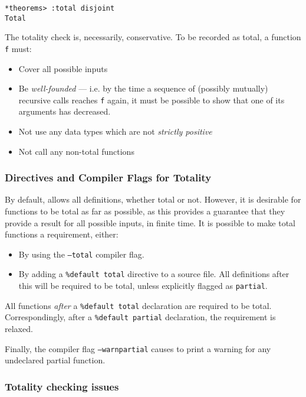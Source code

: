 \begin{lstlisting}[style=stdout]
*theorems> :total disjoint
Total
\end{lstlisting} 

\noindent
The totality check is, necessarily, conservative.
To be recorded as total, a function \texttt{f} must:

\begin{itemize}
\item Cover all possible inputs
\item Be \emph{well-founded} --- i.e. by the time a sequence of  (possibly mutually) recursive calls reaches \texttt{f} again, it must be possible to show that one of its arguments has decreased.
\item Not use any data types which are not \emph{strictly positive}
\item Not call any non-total functions
\end{itemize}

\subsubsection{Directives and Compiler Flags for Totality}

By default, \Idris{} allows all definitions, whether total or not.
However, it is desirable for functions to be total as far as possible, as this provides a guarantee that they provide a result for all possible inputs, in finite time. It is possible to make total functions a requirement, either:

\begin{itemize}
\item By using the \texttt{--total} compiler flag.
\item By adding a \texttt{\%default total} directive to a source file.
All definitions after this will be required to be total, unless explicitly flagged as \texttt{partial}.
\end{itemize}

\noindent
All functions \emph{after} a \texttt{\%default total} declaration are required to be total.
Correspondingly, after a \texttt{\%default partial} declaration, the requirement is relaxed.

Finally, the compiler flag \texttt{--warnpartial} causes \Idris{} to print a warning for any undeclared partial function.

\subsubsection{Totality checking issues}

